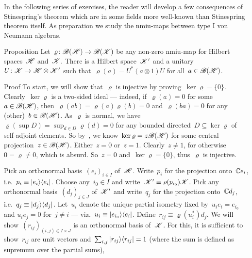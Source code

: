 \documentclass[b]{subfiles}
\begin{document}
\begin{parsec}%
\begin{point}%
In the following series of exercises, the reader will develop
    a few consequences of Stinespring's theorem
    which are in some fields more well-known than
    Stinespring theorem itself.
As preparation we study the nmiu-maps between type I von Neumann algebras.
\end{point}
\begin{point}{Proposition}%
Let~$\varrho\colon \mathscr{B}(\mathscr{H}) \to \mathscr{B}(\mathscr{K})$    
be any non-zero nmiu-map for Hilbert spaces~$\mathscr{H}$ and~$\mathscr{K}$.
There is a Hilbert space~$\mathscr{K}'$
    and a unitary~$U\colon \mathscr{K} \to \mathscr{H} \otimes \mathscr{K}'$
    such that~$\varrho(a) = U^* (a\otimes 1) U $
    for all~$a \in \mathscr{B}(\mathscr{H})$.
\begin{point}{Proof}%
To start, we will show that~$\varrho$ is injective
    by proving~$\ker\varrho = \{0\}$.
Clearly~$\ker \varrho$ is a two-sided ideal
    --- indeed, if~$\varrho(a) = 0$ for some~$a\in \mathscr{B}(\mathscr{H})$,
    then~$\varrho(ab) = \varrho(a)\varrho(b) = 0$
        and~$\varrho(ba) = 0$
        for any (other)~$b \in \mathscr{B}(\mathscr{H})$.
As~$\varrho$ is normal,
    we have~$\varrho(\sup D) = \sup_{d \in D} \varrho(d) = 0$
    for any bounded directed~$D\subseteq \ker \varrho$
    of self-adjoint elements.
So by~,
    we know~$\ker \varrho = z \mathscr{B}(\mathscr{H})$
    for some central projection~$z \in \mathscr{B}(\mathscr{H})$.
Either~$z=0$ or~$z=1$.
Clearly~$z\neq 1$, for otherwise~$0=\varrho\neq 0$, which is absurd.
    So~$z=0$ and~$\ker \varrho = \{0\}$, thus~$\varrho $ is injective.
\begin{point}%
Pick an orthonormal basis~$(e_i)_{i \in I}$ of~$\mathscr{H}$.
Write~$p_i$ for the projection onto~$\mathbb{C} e_i$,
    i.e.~$p_i \equiv \left|e_i\right>\!\left<e_i\right|$.
Choose any~$i_0 \in I$
    and write~$\mathscr{K}' \equiv \varrho(p_{i_0}) \mathscr{K}$.
Pick any orthonormal basis~$(d_j)_{j \in J}$ of~$\mathscr{K}'$
    and write~$q_j$ for the projection onto~$\mathbb{C} d_j$,
    i.e.~$q_j \equiv \left|d_j\right>\!\left<d_j\right|$.
Let~$u_i$ denote the unique partial
        isometry fixed by~$u_i e_i = e_{i_0}$ and
                $u_i e_j = 0$ for~$j\neq i$ ---
                viz.~$u_i \equiv \left|e_{i_0}\right>\!\left<e_i\right|$.
    Define~$r_{ij} \equiv \varrho(u_i^*) d_j$.
We will show~$(r_{ij})_{(i,j) \in I\times J}$ is an orthonormal
    basis of~$\mathscr{K}$.
For this, it is sufficient to
    show~$r_{ij}$ are unit vectors
    and~$\sum_{i,j} \left|r_{ij}\right>\!\left<r_{ij}\right| = 1$
    (where the sum is defined as supremum over the partial sums),

\end{point}
\end{point}
\end{point}
\end{parsec}
\end{document}
